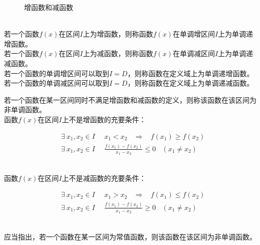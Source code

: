 \documentclass[UTF8]{ctexart}
\begin{document}
\begin{figure}[h]
\begin{center}
{
            }
            \caption{增函数和减函数}
        \end{center}
    \end{figure}\\
    若一个函数$f(x)$在区间$I$上为增函数，则称函数$f(x)$在单调增区间$I$上为单调递增函数。\\[3mm]
    若一个函数$f(x)$在区间$I$上为减函数，则称函数$f(x)$在单调减区间$I$上为单调递减函数。\\[3mm]
    若一个函数的单调增区间可以取到$I=D$，则称函数在定义域上为单调递增函数。\\[3mm]
    若一个函数的单调减区间可以取到$I=D$，则称函数在定义域上为单调递减函数。

\newpage

    若一个函数在某一区间同时不满足增函数和减函数的定义，则称该函数在该区间为非单调函数。\\[3mm]
    函数$f(x)$在区间$I$上不是增函数的充要条件：\vspace{3pt}
    \begin{large}
        \begin{align*}
            &\exists~x_1,x_2\in I~~~~~~x_1<x_2~~~~\Longrightarrow~~~~f(x_1)\geq f(x_2)\\[4mm]
            &\exists~x_1,x_2\in I~~~~~~\frac{f(x_1)-f(x_2)}{x_1-x_2}\leq 0~~~~(x_1\neq x_2)
        \end{align*}
    \end{large}\\
    函数$f(x)$在区间$I$上不是减函数的充要条件：\vspace{3pt}
    \begin{large}
        \begin{align*}
            &\exists~x_1,x_2\in I~~~~~~x_1>x_2~~~~\Longrightarrow~~~~f(x_1)\leq f(x_2)\\[4mm]
            &\exists~x_1,x_2\in I~~~~~~\frac{f(x_1)-f(x_2)}{x_1-x_2}\geq 0~~~~(x_1\neq x_2)
        \end{align*}
    \end{large}\\
    应当指出，若一个函数在某一区间为常值函数，则该函数在该区间为非单调函数。
\end{document}
